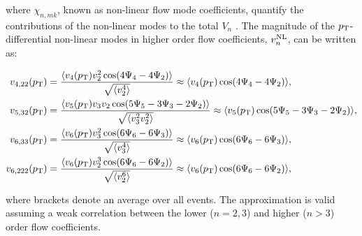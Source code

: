 where $\chi_{n,mk}$, known as non-linear flow mode coefficients, quantify the contributions of the non-linear modes to the total $V_{n}$ \cite{Yan:2015jma, Acharya:2017zfg}. The magnitude of the $p_{\rm{T}}$-differential non-linear modes in higher order flow coefficients, $v_{n}^{\rm{NL}}$, can be written as: 

\begin{align}
v_{4,22}(p_{\rm{T}})&= \frac{\langle v_{4}(p_{\rm{T}})v_{2}^{2}\cos(4\Psi_{4}-4\Psi_{2})\rangle}{\sqrt{\langle v_{2}^{4}\rangle}} \approx \langle v_{4}(p_{\rm{T}})\cos(4\Psi_{4}-4\Psi_{2})\rangle, \label{Eq:V422}\\
v_{5,32}(p_{\rm{T}})&= \frac{\langle v_{5}(p_{\rm{T}})v_{3}v_{2}\cos(5\Psi_{5}-3\Psi_{3}-2\Psi_{2})\rangle}{\sqrt{\langle v_{3}^{2}v_{2}^{2}\rangle}} \approx \langle v_{5}(p_{\rm{T}})\cos(5\Psi_{5}-3\Psi_{3}-2\Psi_{2})\rangle, \label{Eq:V532}\\
v_{6,33}(p_{\rm{T}}) &= \frac{\langle v_{6}(p_{\rm{T}})v_{3}^{2}\cos(6\Psi_{6}-6\Psi_{3})\rangle}{\sqrt{\langle v_{3}^{4}\rangle}} \approx \langle v_{6}(p_{\rm{T}})\cos(6\Psi_{6}-6\Psi_{3})\rangle , \label{Eq:V633}\\
v_{6,222}(p_{\rm{T}}) &= \frac{\langle v_{6}(p_{\rm{T}})v_{2}^{3}\cos(6\Psi_{6}-6\Psi_{2})\rangle}{\sqrt{\langle v_{2}^{6}\rangle}} \approx \langle v_{6}(p_{\rm{T}})\cos(6\Psi_{6}-6\Psi_{2})\rangle,
\label{Eq:V6222}
\end{align}

\noindent where brackets denote an average over all events. The approximation is valid assuming a weak correlation between the lower ($n=2,3$) and higher ($n>3$) order flow coefficients.

